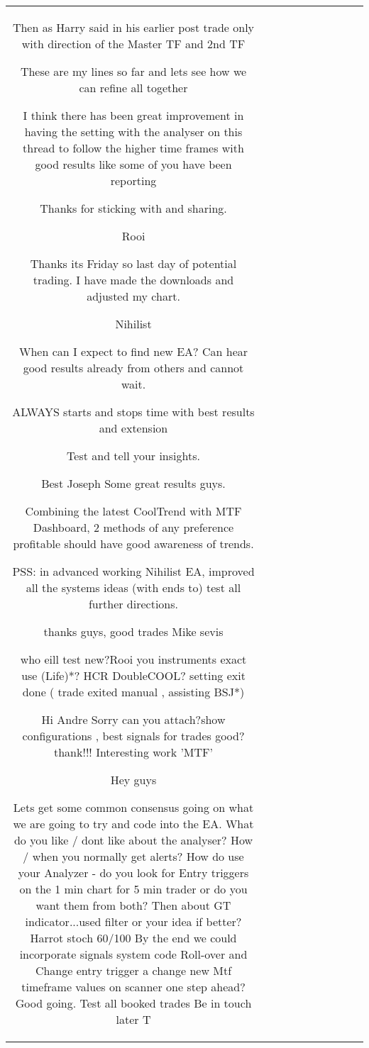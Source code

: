 \begin{table}[h!]
\begin{tabular}{|c|c|c|c|c|c|c|c|c|c|}
Then as Harry said in his earlier post trade only with direction of the Master TF and 2nd TF

These are my lines so far and lets see how we can refine all together

I think there has been great improvement in having the setting with the analyser on this thread to follow the higher time frames with good results like some of you have been reporting

Thanks for sticking with and sharing.

Rooi


Thanks its Friday so last day of potential trading. I have made the downloads and adjusted my chart.

Nihilist

When can I expect to find new EA? Can hear good results already from others and cannot wait.

ALWAYS starts and stops time with best results and extension

Test and tell your insights.

Best
Joseph
Some great results guys.

Combining the latest CoolTrend with MTF Dashboard, 2 methods of any preference profitable should have good awareness of trends.

PSS: in advanced working Nihilist EA, improved all the systems ideas (with ends to) test all further directions.

thanks guys, good trades
Mike sevis



who eill test new?Rooi you instruments exact use (Life)*? HCR DoubleCOOL? setting exit done ( trade exited manual , assisting BSJ*)

Hi Andre
Sorry can you attach?show configurations , best signals for trades good? thank!!!
Interesting work 'MTF'

Hey guys

Lets get some common consensus going on what we are going to try and code into the EA.
What do you like / dont like about the analyser?
How / when you normally get alerts?
How do use your Analyzer - do you look for Entry triggers on the 1 min chart for 5 min trader or do you want them from both?
Then about GT indicator...used filter or your idea if better? Harrot stoch 60/100
By the end we could incorporate signals system code Roll-over and Change entry trigger a change new Mtf timeframe values on scanner
one step ahead? 
Good going.
Test all booked trades 
Be in touch later
T


\end{tabular}
\end{table}
